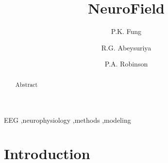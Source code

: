 \documentclass[preprint,review,10pt,authoryear,letterpaper]{elsarticle}
\begin{document}
\begin{frontmatter}



\title{NeuroField}


\author{P.K. Fung}
\author{R.G. Abeysuriya\corref{}}

\author{P.A. Robinson\corref{}}

\address{School of Physics, University of Sydney, New South Wales, Australia}


\begin{abstract}
Abstract

\end{abstract}

\begin{keyword}
EEG \sep neurophysiology \sep methods \sep modeling

\end{keyword}

\end{frontmatter}

\linenumbers

\section{Introduction}
\label{sec:introduction}
\end{document}
